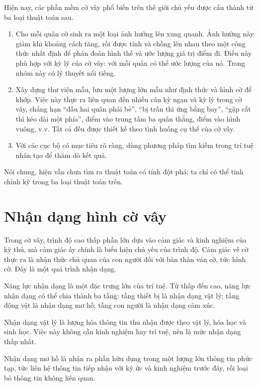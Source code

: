 \documentclass[11pt]{article}
\begin{document}
Hiện nay, các phần mềm cờ vây phổ biến trên thế giới chủ yếu được cấu thành
từ ba loại thuật toán sau.

\begin{enumerate}
  \item Cho mỗi quân cờ sinh ra một loại ảnh hưởng lên xung quanh. Ảnh hưởng
  này giảm khi khoảng cách tăng, rồi được tính và chồng lên nhau theo một
  công thức nhất định để phán đoán hình thế và ước lượng giá trị điểm đi. Điều
  này phù hợp với kỳ lý của cờ vây: với mỗi quân có thể ước lượng
   của nó. Trong nhóm này có lý thuyết  nổi
  tiếng.

  \item Xây dựng thư viện mẫu, lưu một lượng lớn mẫu như định thức và hình cờ
  để khớp. Việc này thực ra liên quan đến nhiều câu kỳ ngạn và kỳ lý trong cờ
  vây, chẳng hạn ``đầu hai quân phải bẻ'', ``bị trấn thì ứng bằng bay'',
  ``gặp cắt thì kéo dài một phía'', điểm vào trung tâm ba quân thẳng, điểm vào
  hình vuông, v.v. Tất cả đều được thiết kế theo tình huống cụ thể của cờ vây.

  \item Với các cục bộ có mục tiêu rõ ràng, dùng phương pháp tìm kiếm trong
  trí tuệ nhân tạo để thăm dò kết quả.
\end{enumerate}

Nói chung, hiện vẫn chưa tìm ra thuật toán có tính đột phá; ta chỉ có thể
tinh chỉnh kỹ trong ba loại thuật toán trên.

\section{Nhận dạng hình cờ vây}

Trong cờ vây, trình độ cao thấp phần lớn dựa vào cảm giác và kinh nghiệm của
kỳ thủ, mà cảm giác ấy chính là biểu hiện chủ yếu của trình độ. Cảm giác về
cờ thực ra là nhận thức chủ quan của con người đối với bản thân ván cờ, tức
hình cờ. Đây là một quá trình nhận dạng.

Năng lực nhận dạng là một đặc trưng lớn của trí tuệ. Từ thấp đến cao, năng
lực nhận dạng có thể chia thành ba tầng: tầng thiết bị là nhận dạng vật lý;
tầng động vật là nhận dạng mơ hồ; tầng con người là nhận dạng cảm xúc.

Nhận dạng vật lý là lượng hóa thông tin thu nhận được theo vật lý, hóa học và
sinh học. Việc này không cần kinh nghiệm hay trí tuệ, nên là mức nhận dạng
thấp nhất.

Nhận dạng mơ hồ là nhận ra phần hữu dụng trong một lượng lớn thông tin phức
tạp, tức liên hệ thông tin tiếp nhận với ký ức và kinh nghiệm trước đây, rồi
loại bỏ thông tin không liên quan.
\end{document}
